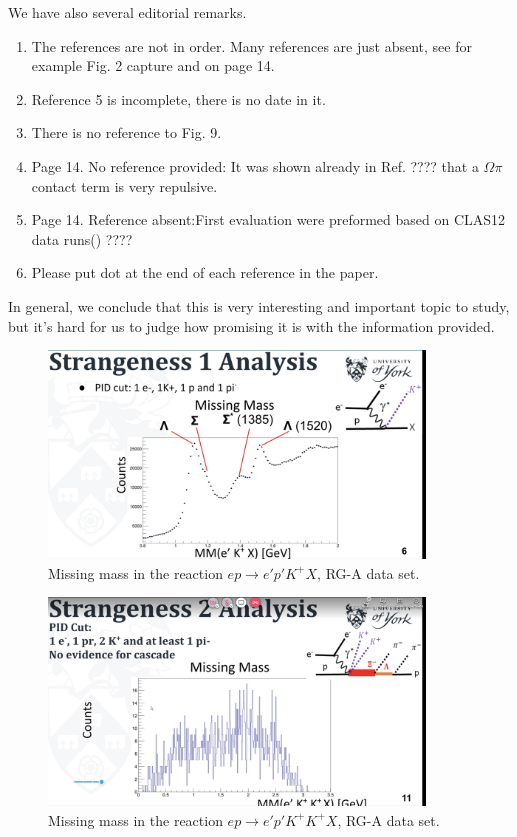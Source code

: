 \documentclass[prc,floatfix,superscriptaddress,letter]{revtex4}
\begin{document}
We have also several editorial remarks. \begin{enumerate}

\item The references are not in order. Many references are just absent, see for example  Fig. 2 capture and on page 14.
\item Reference 5 is incomplete, there is no date in it.
\item There is no reference to Fig. 9.
\item Page 14. No reference provided:  It was shown already in
Ref. ???? that a $\Omega \pi$  contact term is very repulsive.
\item Page 14. Reference absent:First evaluation were preformed based on CLAS12 data runs() ????
\item Please put dot at the end of each reference in the paper.
\end{enumerate}


In general, we conclude that  this is very interesting and important topic to 
study, but it's hard for us to judge how promising it is with the 
information provided. 

\begin{figure}
\includegraphics[width=10cm]{e-K+_mm.png} 
\caption{
Missing mass in the reaction $ep\to e'p'K^+X$, RG-A data set.
} 
\label{fig:e-K+_mm}
\end{figure}
 
\begin{figure}
\includegraphics[width=10cm]{e-K+K+_mm.png} 
\caption{
Missing mass in the reaction $ep\to e'p'K^+K^+X$, RG-A data set.
} 
\label{fig:e-K+K+_mm}
\end{figure}
\end{document}
